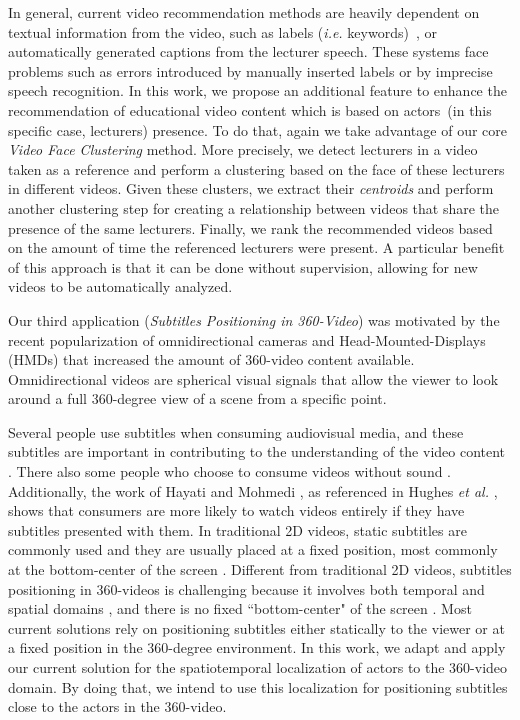 In general, current video recommendation methods are heavily dependent on textual information from the video, such as labels (\textit{i.e.} keywords)~\cite{mahajan2015optimising,omisore2014personalized}, or automatically generated captions \cite{barrere2020utilizaccao} from the lecturer speech. These systems face problems such as errors introduced by manually inserted labels or by imprecise speech recognition.
In this work, we propose an additional feature to enhance the recommendation of educational video content which is based on actors~(in this specific case, lecturers) presence. To do that, again we take advantage of our core \emph{Video Face Clustering} method. More precisely, we detect lecturers in a video taken as a reference and perform a clustering based on the face of these lecturers in different videos. Given these clusters, we extract their \textit{centroids} and perform another clustering step for creating a relationship between videos that share the presence of the same lecturers. Finally, we rank the recommended videos based on the amount of time the referenced lecturers were present.
A particular benefit of this approach is that it can be done without supervision, allowing for new videos to be automatically analyzed.

Our third application (\emph{Subtitles Positioning in 360-Video}) was motivated by the recent popularization of omnidirectional cameras and Head-Mounted-Displays (HMDs) that increased the amount of 360-video content available. Omnidirectional videos are spherical visual signals that allow the viewer to look around a full 360-degree view of a scene from a specific point.

Several people use subtitles when consuming audiovisual media, and these subtitles are important in contributing to the understanding of the video content \cite{brown_subtitles_2017}. There also some people who choose to consume videos without sound \cite{hughes_disruptive_2019}. Additionally, the work of Hayati and Mohmedi \cite{hayati2011effect}, as referenced in Hughes \emph{et al.} \cite{hughes_disruptive_2019}, shows that consumers are more likely to watch videos entirely if they have subtitles presented with them. In traditional 2D videos, static subtitles are commonly used and they are usually placed at a fixed position, most commonly at the bottom-center of the screen \cite{rothe_dynamic_2018}.
Different from traditional 2D videos, subtitles positioning in 360-videos is challenging because it involves both temporal and spatial domains \cite{agullo2019making}, and there is no fixed ``bottom-center" of the screen \cite{brown_subtitles_2017}. Most current solutions rely on positioning subtitles either statically to the viewer or at a fixed position in the 360-degree environment. 
In this work, we adapt and apply our current solution for the spatiotemporal localization of actors to the 360-video domain. By doing that, we intend to use this localization for positioning subtitles close to the actors in the 360-video.


